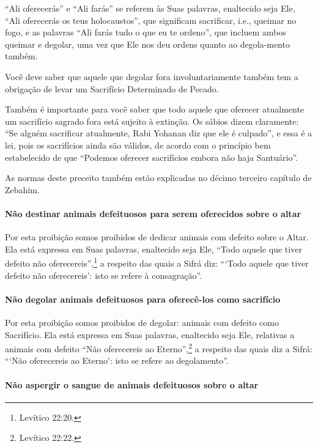 ``Ali oferecerás'' e ``Ali farás'' se referem às Suas palavras,
enaltecido seja Ele, ``Ali oferecerás os teus holocaustos'', que
significam sacrificar, i.e., queimar no fogo, e as palavras ``Ali farás
tudo o que eu te ordeno'', que incluem ambos queimar e degolar, uma vez
que Ele nos deu ordens quanto ao degola-mento também.

Você deve saber que aquele que degolar fora involuntariamente também
tem a obrigação de levar um Sacrifício Determinado de Pecado.

Também é importante para você saber que todo aquele que oferecer
atualmente um sacrifício sagrado fora está sujeito à extinção. Os sábios
dizem claramente: ``Se alguém sacrificar atualmente, Rabi Yohanan diz
que ele é culpado'', e essa é a lei, pois os sacrifícios ainda são
válidos, de acordo com o princípio bem estabelecido de que ``Podemos
oferecer sacrifícios embora não haja Santuário''.

As normas deste preceito também estão explicadas no décimo terceiro
capítulo de Zebahim.

\paragraph{Não destinar animais defeituosos para serem oferecidos sobre o altar}

Por esta proibição somos proibidos de dedicar animais com defeito sobre
o Altar. Ela está expressa em Suas palavras, enaltecido seja Ele, ``Todo
aquele que tiver defeito não oferecereis'',\footnote{Levítico 22:20.} a respeito
das quais a Sifrá diz: ```Todo aquele que tiver defeito não
oferecereis': isto se refere à consagração''.

\paragraph{Não degolar animais defeituosos para oferecê-los como sacrifício}

Por esta proibição somos proibidos de degolar: animais com defeito como
Sacrifício. Ela está expressa em Suas palavras, enaltecido seja Ele,
relativas a animais com defeito ``Não oferecereis ao Eterno'',\footnote{Levítico
22:22.} a respeito das quais diz a Sifrá: ```Não oferecereis ao Eterno':
isto se refere ao degolamento''.


\paragraph{Não aspergir o sangue de animais defeituosos sobre o altar}

